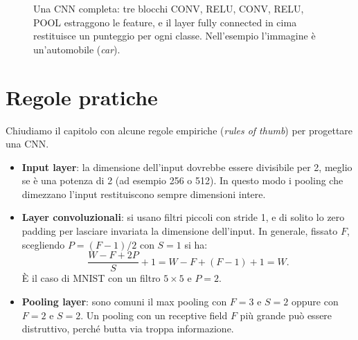 \begin{figure}[htbp]
\centering
{}
\caption{Una CNN completa: tre blocchi CONV, RELU, CONV, RELU, POOL estraggono le feature, e il layer fully connected in cima restituisce un punteggio per ogni classe. Nell'esempio l'immagine è un'automobile (\emph{car}).}
\label{fig:cnn-pipeline-fc}
\end{figure}

\section{Regole pratiche}\label{sec:cnn-regole}
Chiudiamo il capitolo con alcune regole empiriche (\emph{rules of thumb}) per progettare una CNN.
\begin{itemize}
    \item \textbf{Input layer}: la dimensione dell'input dovrebbe essere divisibile per 2, meglio se è una potenza di 2 (ad esempio 256 o 512). In questo modo i pooling che dimezzano l'input restituiscono sempre dimensioni intere.
    \item \textbf{Layer convoluzionali}: si usano filtri piccoli con stride 1, e di solito lo zero padding per lasciare invariata la dimensione dell'input. In generale, fissato $F$, scegliendo $P = (F - 1)/2$ con $S = 1$ si ha:
    \[
    \frac{W - F + 2P}{S} + 1 = W - F + (F - 1) + 1 = W.
    \]
    È il caso di MNIST con un filtro $5 \times 5$ e $P = 2$.
    \item \textbf{Pooling layer}: sono comuni il max pooling con $F = 3$ e $S = 2$ oppure con $F = 2$ e $S = 2$. Un pooling con un receptive field $F$ più grande può essere distruttivo, perché butta via troppa informazione.
\end{itemize}

